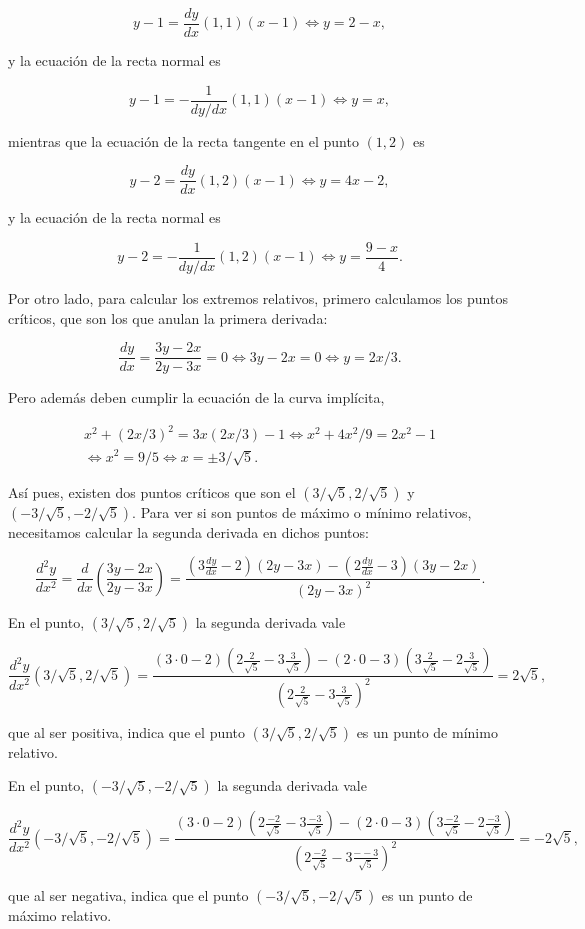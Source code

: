 \documentclass[
  spanish,
  a4paper,
]{scrreport}
\theoremstyle{definition}
\theoremstyle{remark}
\begin{document}
\begin{tcolorbox}
\[
y-1 = \frac{dy}{dx}(1,1)(x-1) \Leftrightarrow y= 2-x,
\]

y la ecuación de la recta normal es

\[
y-1 = -\frac{1}{dy/dx}(1,1)(x-1) \Leftrightarrow y= x,
\]

mientras que la ecuación de la recta tangente en el punto \((1,2)\) es

\[
y-2 = \frac{dy}{dx}(1,2)(x-1) \Leftrightarrow y= 4x-2,
\]

y la ecuación de la recta normal es

\[
y-2 = -\frac{1}{dy/dx}(1,2)(x-1) \Leftrightarrow y=\frac{9-x}{4}.
\]

Por otro lado, para calcular los extremos relativos, primero calculamos
los puntos críticos, que son los que anulan la primera derivada:

\[
\frac{dy}{dx}=\frac{3y-2x}{2y-3x}=0 \Leftrightarrow 3y-2x=0 \Leftrightarrow y=2x/3.
\]

Pero además deben cumplir la ecuación de la curva implícita,

\[
\begin{gathered}
x^{2}+(2x/3)^{2}=3x(2x/3)-1 \Leftrightarrow x^{2}+4x^{2}/9 = 2x^{2}-1\\  \Leftrightarrow x^{2}=9/5 \Leftrightarrow x=\pm 3/\sqrt{5}.
\end{gathered}
\]

Así pues, existen dos puntos críticos que son el
\((3/\sqrt{5},2/\sqrt{5})\) y \((-3/\sqrt{5},-2/\sqrt{5})\). Para ver si
son puntos de máximo o mínimo relativos, necesitamos calcular la segunda
derivada en dichos puntos:

\[
\frac{d^{2}y}{dx^{2}}= \frac{d}{dx}\left(\frac{3y-2x}{2y-3x}\right) = \frac{(3\frac{dy}{dx}-2)(2y-3x)-(2\frac{dy}{dx}-3)(3y-2x)}{(2y-3x)^{2}}.
\]

En el punto, \((3/\sqrt{5},2/\sqrt{5})\) la segunda derivada vale

\[
\frac{d^{2}y}{dx^{2}}(3/\sqrt{5},2/\sqrt{5})=
\frac{(3\cdot 0-2)(2\frac{2}{\sqrt{5}}-3\frac{3}{\sqrt{5}})-(2\cdot 0-3)(3\frac{2}{\sqrt{5}}-2\frac{3}{\sqrt{5}})}{(2\frac{2}{\sqrt{5}}-3\frac{3}{\sqrt{5}})^{2}} = 2\sqrt{5},
\]

que al ser positiva, indica que el punto \((3/\sqrt{5},2/\sqrt{5})\) es
un punto de mínimo relativo.

En el punto, \((-3/\sqrt{5},-2/\sqrt{5})\) la segunda derivada vale

\[
\frac{d^{2}y}{dx^{2}}(-3/\sqrt{5},-2/\sqrt{5})=
\frac{(3\cdot 0-2)(2\frac{-2}{\sqrt{5}}-3\frac{-3}{\sqrt{5}})-(2\cdot 0-3)(3\frac{-2}{\sqrt{5}}-2\frac{-3}{\sqrt{5}})}{(2\frac{-2}{\sqrt{5}}-3\frac{--3}{\sqrt{5}})^{2}} = -2\sqrt{5},
\]

que al ser negativa, indica que el punto \((-3/\sqrt{5},-2/\sqrt{5})\)
es un punto de máximo relativo.

\end{tcolorbox}
\end{document}
